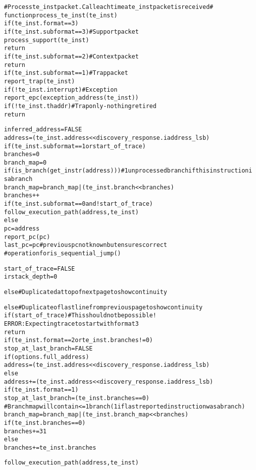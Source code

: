 \begin{alltt}
# Process te_inst packet.  Call each time a te_inst packet is received #
function process_te_inst (te_inst)
  if (te_inst.format == 3)
    if (te_inst.subformat == 3) # Support packet
      process_support(te_inst)
      return
    if (te_inst.subformat == 2) # Context packet
      return
    if (te_inst.subformat == 1) # Trap packet
      report_trap(te_inst)
      if (!te_inst.interrupt) # Exception
        report_epc(exception_address(te_inst))
      if (!te_inst.thaddr) # Trap only - nothing retired
        return

    inferred_address = FALSE
    address       = (te_inst.address << discovery_response.iaddress_lsb)
    if (te_inst.subformat == 1 or start_of_trace)
      branches    = 0
      branch_map  = 0
    if (is_branch(get_instr(address))) # 1 unprocessed branch if this instruction is a branch
      branch_map = branch_map | (te_inst.branch << branches)
      branches++
    if (te_inst.subformat == 0 and !start_of_trace)
      follow_execution_path(address, te_inst)
    else
      pc           = address
      report_pc(pc)
      last_pc      = pc # previous pc not known but ensures correct
                        #  operation for is_sequential_jump()

    start_of_trace = FALSE
    irstack_depth  = 0

  else # Duplicated at top of next page to show continuity
\end{alltt}
\pagebreak

\begin{alltt}
  else # Duplicate of last line from previous page to show continuity
    if (start_of_trace) # This should not be possible!
      ERROR: Expecting trace to start with format 3
      return
    if (te_inst.format == 2 or te_inst.branches != 0)
      stop_at_last_branch = FALSE
      if (options.full_address)
        address  = (te_inst.address << discovery_response.iaddress_lsb)
      else
        address += (te_inst.address << discovery_response.iaddress_lsb)
    if (te_inst.format == 1)
      stop_at_last_branch = (te_inst.branches == 0)
      # Branch map will contain <= 1 branch (1 if last reported instruction was a branch)
      branch_map = branch_map | (te_inst.branch_map << branches)
      if (te_inst.branches == 0)
        branches += 31
      else
        branches += te_inst.branches

    follow_execution_path(address, te_inst)
\end{alltt}

